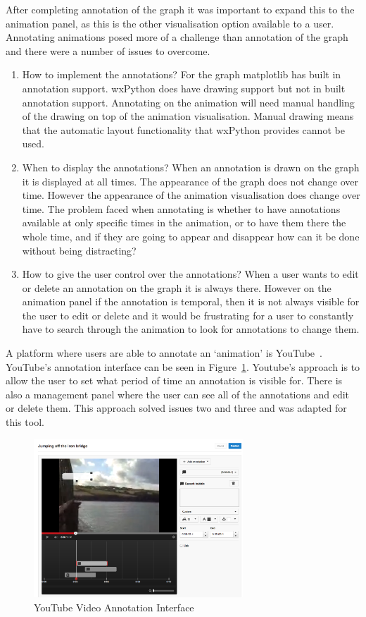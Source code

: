 After completing annotation of the graph it was important to expand this to the animation panel, as this is the other visualisation option available to a user.  Annotating animations posed more of a challenge than annotation of the graph and there were a number of issues to overcome.

\begin{enumerate}
\item How to implement the annotations?  For the graph matplotlib has built in annotation support.  wxPython does have drawing support but not in built annotation support.  Annotating on the animation will need manual handling of the drawing on top of the animation visualisation.  Manual drawing means that the automatic layout functionality that wxPython provides cannot be used.
\item When to display the annotations?  When an annotation is drawn on the graph it is displayed at all times.  The appearance of the graph does not change over time.  However the appearance of the animation visualisation does change over time.  The problem faced when annotating is whether to have annotations available at only specific times in the animation, or to have them there the whole time, and if they are going to appear and disappear how can it be done without being distracting?
\item How to give the user control over the annotations? When a user wants to edit or delete an annotation on the graph it is always there.  However on the animation panel if the annotation is temporal, then it is not always visible for the user to edit or delete and it would be frustrating for a user to constantly have to search through the animation to look for annotations to change them.
\end{enumerate}

A platform where users are able to annotate an `animation' is YouTube~\cite{youtube}.  YouTube's annotation interface can be seen in Figure~\ref{fig:youtube}.  Youtube's approach is to allow the user to set what period of time an annotation is visible for.  There is also a management panel where the user can see all of the annotations and edit or delete them.  This approach solved issues two and three and was adapted for this tool.

\begin{figure}[h!]
    \centering
    \includegraphics[width=0.7\textwidth]{images/youtube.png}
    \caption{YouTube Video Annotation Interface}
    \label{fig:youtube}
\end{figure}

